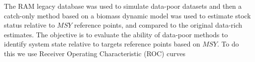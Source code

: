 
The RAM legacy database was used to simulate data-poor datasets and then a catch-only method based on a biomass dynamic model was used to estimate stock status relative to $MSY$ reference points, and compared to the original data-rich estimates. %
The objective is to evaluate the ability of data-poor methods to identify system state relative to targets reference points based on $MSY$. To do this we use Receiver Operating Characteristic (ROC) curves  \citep{green1966signal} 

